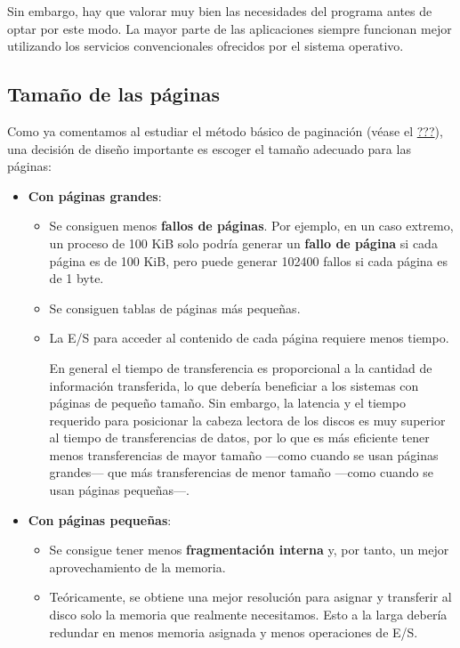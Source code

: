 Sin embargo, hay que valorar muy bien las necesidades del programa antes
de optar por este modo. La mayor parte de las aplicaciones siempre
funcionan mejor utilizando los servicios convencionales ofrecidos por el
sistema operativo.

\subsection{Tamaño de las páginas}\label{_tamauxf1o_de_las_puxe1ginas}

Como ya comentamos al estudiar el método básico de paginación (véase el
\hyperref[paginaciuxf3n]{???}), una decisión de diseño importante es
escoger el tamaño adecuado para las páginas:

\begin{itemize}
\item
  \textbf{Con páginas grandes}:

  \begin{itemize}
  \item
    Se consiguen menos \textbf{fallos de páginas}. Por ejemplo, en un
    caso extremo, un proceso de 100 KiB solo podría generar un
    \textbf{fallo de página} si cada página es de 100 KiB, pero puede
    generar 102400 fallos si cada página es de 1 byte.
  \item
    Se consiguen tablas de páginas más pequeñas.
  \item
    La E/S para acceder al contenido de cada página requiere menos
    tiempo.

    En general el tiempo de transferencia es proporcional a la cantidad
    de información transferida, lo que debería beneficiar a los sistemas
    con páginas de pequeño tamaño. Sin embargo, la latencia y el tiempo
    requerido para posicionar la cabeza lectora de los discos es muy
    superior al tiempo de transferencias de datos, por lo que es más
    eficiente tener menos transferencias de mayor tamaño ---como cuando
    se usan páginas grandes--- que más transferencias de menor tamaño
    ---como cuando se usan páginas pequeñas---.
  \end{itemize}
\item
  \textbf{Con páginas pequeñas}:

  \begin{itemize}
  \item
    Se consigue tener menos \textbf{fragmentación interna} y, por tanto,
    un mejor aprovechamiento de la memoria.
  \item
    Teóricamente, se obtiene una mejor resolución para asignar y
    transferir al disco solo la memoria que realmente necesitamos. Esto
    a la larga debería redundar en menos memoria asignada y menos
    operaciones de E/S.
  \end{itemize}
\end{itemize}

